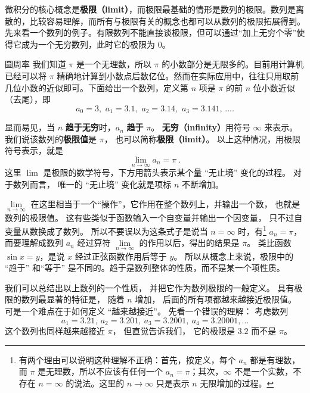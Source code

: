 
微积分的核心概念是\textbf{极限（limit）}，而极限最基础的情形是数列的极限。数列是离散的，比较容易理解，而所有与极限有关的概念也都可以从数列的极限拓展得到。 先来看一个数列的例子。有限数列不能直接谈极限，但可以通过“加上无穷个零”使得它成为一个无穷数列，此时它的极限为 $0$。

\begin{example}{圆周率}\label{ex_Lim0_1}
我们知道 $\pi$ 是一个无理数，所以 $\pi$ 的小数部分是无限多的。目前用计算机已经可以将 $\pi$ 精确地计算到小数点后数亿位。然而在实际应用中，往往只用取前几位小数的近似即可。下面给出一个数列，定义第 $n$ 项是 $\pi$ 的前 $n$ 位小数近似（去尾），即
\begin{equation}\label{eq_Lim0_1}
a_0 = 3,\,\, a_1 = 3.1,\,\, a_2 = 3.14,\,\, a_3 = 3.141,\,\dots.
\end{equation}

显而易见，当 $n$ \textbf{趋于无穷}时，$a_n$ \textbf{趋于} $\pi$。 \textbf{无穷（infinity）}用符号 $\infty$ 来表示。 我们说该数列的\textbf{极限值}是 $\pi$， 也可以简称\textbf{极限（limit）}。 以上这种情况，用极限符号表示，就是
\begin{equation}
\lim_{n \to \infty } {a_n} = \pi ~.
\end{equation}
这里 $\lim$ 是极限的数学符号，下方用箭头表示某个量 “无止境” 变化的过程。 对于数列而言， 唯一的 “无止境” 变化就是项标 $n$ 不断增加。%
\end{example}

$\lim\limits_{n \to \infty }$ 在这里相当于一个“操作”，它作用在整个数列上，并输出一个数， 也就是数列的极限值。 这有些类似于函数输入一个自变量并输出一个因变量， 只不过自变量从数换成了数列。 所以不要误以为这条式子是说当 $n = \infty$ 时，有\footnote{有两个理由可以说明这种理解不正确：首先，按定义，每个 $a_n$ 都是有理数，而 $\pi$ 是无理数，所以不应该有任何一个 $a_n=\pi$；其次，$\infty$ 不是一个实数，不存在 $n=\infty$ 的说法。这里的 $n\to\infty$ 只是表示 $n$ 无限增加的过程。} $a_n=\pi$， 而要理解成数列 $a_n$ 经过算符 $\lim\limits_{n \to \infty }$ 的作用以后，得出的结果是 $\pi$。 类比函数 $\sin x = y$，是说 $x$ 经过正弦函数作用后等于 $y$。 所以从概念上来说，极限中的 “趋于” 和“等于” 是不同的。趋于是数列整体的性质，而不是某一个项性质。

我们可以总结出以上数列的一个性质， 并把它作为数列极限的一般定义。 具有极限的数列最显著的特征是， 随着 $n$ 增加， 后面的所有项都越来越接近极限值。 可是一个难点在于如何定义 “越来越接近”。 先看一个错误的理解： 考虑数列
\begin{equation}\label{eq_Lim0_2}
a_1 = 3.21,\ a_2 = 3.201,\ a_3 = 3.2001,\ a_4 = 3.20001, \dots
\end{equation}
这个数列也同样越来越接近 $\pi$， 但直觉告诉我们， 它的极限是 $3.2$ 而不是 $\pi$。

